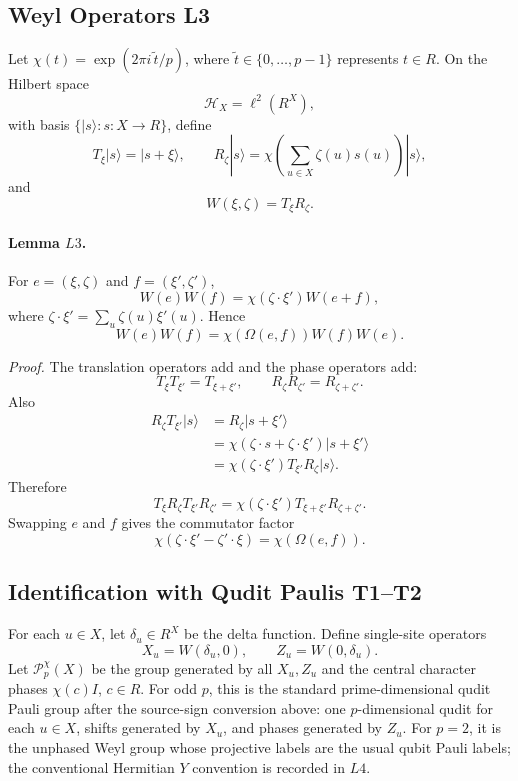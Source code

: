 \subsection{Weyl Operators L3}

Let \(\chi(t)=\exp(2\pi i\,\tilde t/p)\), where \(\tilde t\in\{0,\ldots,p-1\}\)
represents \(t\in R\).  On the Hilbert space
\[
  \mathcal H_X=\ell^2(R^X),
\]
with basis \(\{|s\rangle:s:X\to R\}\), define
\[
  T_\xi|s\rangle=|s+\xi\rangle,\qquad
  R_\zeta|s\rangle=\chi\!\left(\sum_{u\in X}\zeta(u)s(u)\right)|s\rangle,
\]
and
\[
  W(\xi,\zeta)=T_\xi R_\zeta.
\]

\paragraph{Lemma \(L3\).}
For \(e=(\xi,\zeta)\) and \(f=(\xi',\zeta')\),
\[
  W(e)W(f)=\chi(\zeta\cdot\xi')W(e+f),
\]
where \(\zeta\cdot\xi'=\sum_u\zeta(u)\xi'(u)\).  Hence
\[
  W(e)W(f)=\chi(\Omega(e,f))W(f)W(e).
\]

\emph{Proof.}
The translation operators add and the phase operators add:
\[
  T_\xi T_{\xi'}=T_{\xi+\xi'},\qquad
  R_\zeta R_{\zeta'}=R_{\zeta+\zeta'}.
\]
Also
\[
\begin{aligned}
  R_\zeta T_{\xi'}|s\rangle
  &=R_\zeta|s+\xi'\rangle\\
  &=\chi(\zeta\cdot s+\zeta\cdot\xi')|s+\xi'\rangle\\
  &=\chi(\zeta\cdot\xi')T_{\xi'}R_\zeta|s\rangle .
\end{aligned}
\]
Therefore
\[
  T_\xi R_\zeta T_{\xi'}R_{\zeta'}
  =
  \chi(\zeta\cdot\xi')T_{\xi+\xi'}R_{\zeta+\zeta'}.
\]
Swapping \(e\) and \(f\) gives the commutator factor
\[
  \chi(\zeta\cdot\xi'-\zeta'\cdot\xi)=\chi(\Omega(e,f)).
\]

\subsection{Identification with Qudit Paulis T1--T2}

For each \(u\in X\), let \(\delta_u\in R^X\) be the delta function.  Define
single-site operators
\[
  X_u=W(\delta_u,0),\qquad Z_u=W(0,\delta_u).
\]
Let \(\mathcal P_p^\chi(X)\) be the group generated by all \(X_u,Z_u\) and the
central character phases \(\chi(c)I\), \(c\in R\).  For odd \(p\), this is the
standard prime-dimensional qudit Pauli group after the source-sign conversion
above: one \(p\)-dimensional qudit for each \(u\in X\), shifts generated by
\(X_u\), and phases generated by \(Z_u\).  For \(p=2\), it is the unphased Weyl
group whose projective labels are the usual qubit Pauli labels; the
conventional Hermitian \(Y\) convention is recorded in \(L4\).

